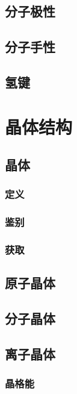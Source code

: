 \documentclass[a4paper]{article}
\begin{document}
	
	\subsection{分子极性}
	
		
	\subsection{分子手性}
	
	
	\subsection{氢键}
		
	
	\clearpage
	\section{晶体结构}
	
	
	\subsection{晶体}
	
	\subsubsection{定义}
	
	\subsubsection{鉴别}
	
	\subsubsection{获取}
	
	
	\subsection{原子晶体}
	
	\subsection{分子晶体}
	
	\subsection{离子晶体}
	
	\subsubsection{晶格能}
	
\end{document}
